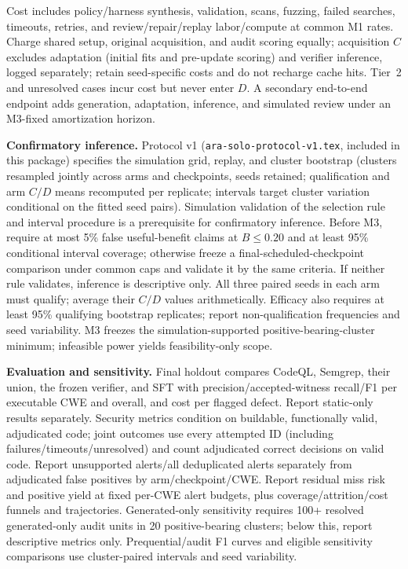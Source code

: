 \documentclass[11pt]{article}
\begin{document}
Cost includes policy/harness synthesis, validation, scans, fuzzing, failed searches, timeouts, retries, and review/repair/replay labor/compute at common M1 rates. Charge shared setup, original acquisition, and audit scoring equally; acquisition $C$ excludes adaptation (initial fits and pre-update scoring) and verifier inference, logged separately; retain seed-specific costs and do not recharge cache hits. Tier~2 and unresolved cases incur cost but never enter $D$. A secondary end-to-end endpoint adds generation, adaptation, inference, and simulated review under an M3-fixed amortization horizon.

\textbf{Confirmatory inference.} Protocol v1 (\texttt{ara-solo-protocol-v1.tex}, included in this package) specifies the simulation grid, replay, and cluster bootstrap (clusters resampled jointly across arms and checkpoints, seeds retained; qualification and arm $C/D$ means recomputed per replicate; intervals target cluster variation conditional on the fitted seed pairs). Simulation validation of the selection rule and interval procedure is a prerequisite for confirmatory inference. Before M3, require at most 5\% false useful-benefit claims at $B\leq0.20$ and at least 95\% conditional interval coverage; otherwise freeze a final-scheduled-checkpoint comparison under common caps and validate it by the same criteria. If neither rule validates, inference is descriptive only. All three paired seeds in each arm must qualify; average their $C/D$ values arithmetically. Efficacy also requires at least 95\% qualifying bootstrap replicates; report non-qualification frequencies and seed variability. M3 freezes the simulation-supported positive-bearing-cluster minimum; infeasible power yields feasibility-only scope.

\textbf{Evaluation and sensitivity.} Final holdout compares CodeQL, Semgrep, their union, the frozen verifier, and SFT with precision/accepted-witness recall/F1 per executable CWE and overall, and cost per flagged defect. Report static-only results separately. Security metrics condition on buildable, functionally valid, adjudicated code; joint outcomes use every attempted ID (including failures/timeouts/unresolved) and count adjudicated correct decisions on valid code. Report unsupported alerts/all deduplicated alerts separately from adjudicated false positives by arm/checkpoint/CWE. Report residual miss risk and positive yield at fixed per-CWE alert budgets, plus coverage/attrition/cost funnels and trajectories. Generated-only sensitivity requires 100+ resolved generated-only audit units in 20 positive-bearing clusters; below this, report descriptive metrics only. Prequential/audit F1 curves and eligible sensitivity comparisons use cluster-paired intervals and seed variability.
\end{document}
